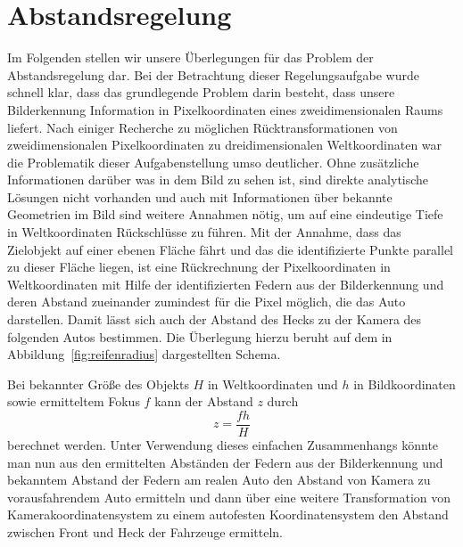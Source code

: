 \documentclass[10pt]{article}
\begin{document}
\section{Abstandsregelung}
\label{sec:Abstandsreglung}
    Im Folgenden stellen wir unsere Überlegungen für das Problem der Abstandsregelung dar.
    Bei der Betrachtung dieser Regelungsaufgabe wurde schnell klar, dass das grundlegende Problem darin besteht, dass unsere Bilderkennung Information in Pixelkoordinaten eines zweidimensionalen Raums liefert.
    Nach einiger Recherche zu möglichen Rücktransformationen von zweidimensionalen Pixelkoordinaten zu dreidimensionalen Weltkoordinaten war die Problematik dieser Aufgabenstellung umso deutlicher.
    Ohne zusätzliche Informationen darüber was in dem Bild zu sehen ist, sind direkte analytische Lösungen nicht vorhanden und auch mit Informationen über bekannte Geometrien im Bild sind weitere Annahmen nötig, um auf eine eindeutige Tiefe in Weltkoordinaten Rückschlüsse zu führen.
    Mit der Annahme, dass das Zielobjekt auf einer ebenen Fläche fährt und das die identifizierte Punkte parallel zu dieser Fläche liegen, ist eine Rückrechnung der Pixelkoordinaten in Weltkoordinaten mit Hilfe der identifizierten Federn aus der Bilderkennung und deren Abstand zueinander zumindest für die Pixel möglich, die das Auto darstellen.
    Damit lässt sich auch der Abstand des Hecks zu der Kamera des folgenden Autos bestimmen.
    Die Überlegung hierzu beruht auf dem in Abbildung~\ref{fig:reifenradius} dargestellten Schema.

    Bei bekannter Größe des Objekts $H$ in Weltkoordinaten und $h$ in Bildkoordinaten sowie ermitteltem Fokus $f$ kann der Abstand $z$ durch \[
    z = \frac{fh}{H}
    \] berechnet werden.
    Unter Verwendung dieses einfachen Zusammenhangs könnte man nun aus den ermittelten Abständen der Federn aus der Bilderkennung und bekanntem Abstand der Federn am realen Auto den Abstand von Kamera zu vorausfahrendem Auto ermitteln und dann über eine weitere Transformation von Kamerakoordinatensystem zu einem autofesten Koordinatensystem den Abstand zwischen Front und Heck der Fahrzeuge ermitteln.
\end{document}
